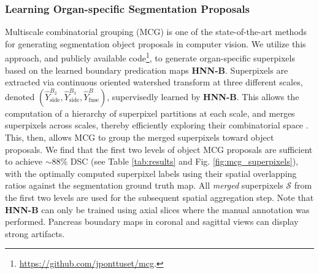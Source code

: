 \documentclass[journal]{IEEEtran}
\begin{document}
\subsubsection{Learning Organ-specific Segmentation Proposals}\label{sec:segPro} Multiscale combinatorial grouping (MCG) \cite{pont-tuset2015mcg} is one of the state-of-the-art methods for generating segmentation object proposals in computer vision. We utilize this approach, and publicly available code\footnote{\scriptsize\url{https://github.com/jponttuset/mcg}.}, to generate organ-specific superpixels based on the learned boundary predication maps \textbf{HNN-B}. Superpixels are extracted via continuous oriented watershed transform at three different scales, denoted $(\hat{Y}_\mathrm{side}^{B_2}, \hat{Y}_\mathrm{side}^{B_3} , \hat{Y}_\mathrm{fuse}^{B})$, supervisedly learned by \textbf{HNN-B}. This allows the computation of a hierarchy of superpixel partitions at each scale, and merges superpixels across scales, thereby efficiently exploring their combinatorial space \cite{pont-tuset2015mcg}. This, then, allows MCG to group the merged superpixels toward object proposals. We find that the first two levels of object MCG proposals are sufficient to achieve $\sim88\%$ DSC (see Table \ref{tab:results} and Fig. \ref{fig:mcg_superpixels}), with the optimally computed superpixel labels using their spatial overlapping ratios against the segmentation ground truth map. All \textit{merged} superpixels $\mathcal{S}$ from the first two levels are used for the subsequent spatial aggregation step. Note that \textbf{HNN-B} can only be trained using axial slices where the manual annotation was performed. Pancreas boundary maps in coronal and sagittal views can display strong artifacts.
\begin{figure*}[htb]%
 \centering	
    \def\svgwidth{0.85\textwidth}
        
	\caption{\small Multiscale combinatorial grouping (MCG) \cite{pont-tuset2015mcg} on three different scales of learned boundary predication maps from \textbf{HNN-B}: $\hat{Y}^{B_2}_{\mathrm{side}}$, $\hat{Y}^{B_3}_{\mathrm{side}}$, and $\hat{Y}^{B}_{\mathrm{fuse}}$ using the original CT image on far left as input (with ground truth delineation of pancreas in red). MCG computes superpixels at each scale and produces a set of merged superpixel-based object proposals. We only visualize the boundary probabilities whose values are greater than $.10$ (Figure reproduced from \cite{roth2016spatial}).}
	\label{fig:mcg_superpixels}
\end{figure*}
\end{document}
